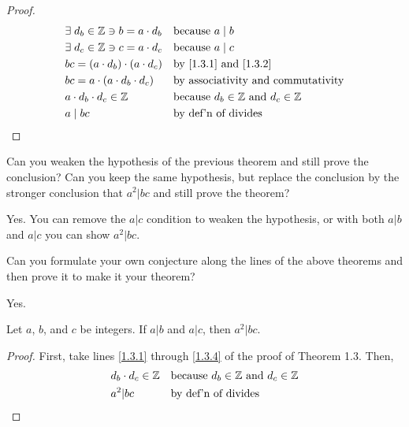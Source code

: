 \documentclass[../main.tex]{subfiles}
\begin{document}
\begin{proof}
\begin{align}
    \label{1.3.1}
    &\exists \; d_b \in \mathbb{Z} \ni b = a \cdot d_b && \mbox{because } a \mid b \\
    \label{1.3.2}
    &\exists \; d_c \in \mathbb{Z} \ni c = a \cdot d_c && \mbox{because } a \mid c \\
    &bc = (a \cdot d_b) \cdot (a \cdot d_c) && \mbox{by \eqref{1.3.1} and \eqref{1.3.2}} \\
    \label{1.3.4}
    &bc = a \cdot (a \cdot d_b \cdot d_c) && \mbox{by associativity and commutativity} \\
    &a \cdot d_b \cdot d_c \in \mathbb{Z} && \mbox{because } d_b \in \mathbb{Z} \mbox{ and } d_c \in \mathbb{Z} \\
    &a \mid bc && \mbox{by def'n of divides} \qedhere
\end{align}
\end{proof}



\begin{ques} \label{1.4}
    Can you weaken the hypothesis of the previous theorem and still prove the conclusion? Can you keep the same hypothesis, but replace the conclusion by the stronger conclusion that $a^2 | bc$ and still prove the theorem?
\end{ques}

Yes. You can remove the $a | c$ condition to weaken the hypothesis, or with both $a | b$ and $a | c$ you can show $a^2 | bc$.



\pagebreak



\begin{ques} \label{1.5}
Can you formulate your own conjecture along the lines of the above theorems and then prove it to make it your theorem?
\end{ques}

Yes.

\begin{PC} \label{PC 1.5}
Let $a$, $b$, and $c$ be integers. If $a|b$ and $a|c$, then $a^2|bc$.
\end{PC}

\begin{proof}
First, take lines \eqref{1.3.1} through \eqref{1.3.4} of the proof of Theorem 1.3. Then,
\begin{align*}
    &d_b \cdot d_c \in \mathbb{Z} && \mbox{because } d_b \in \mathbb{Z} \mbox{ and } d_c \in \mathbb{Z} \\
    &a^2|bc && \mbox{by def'n of divides} \qedhere
\end{align*}
\end{proof}
\end{document}
